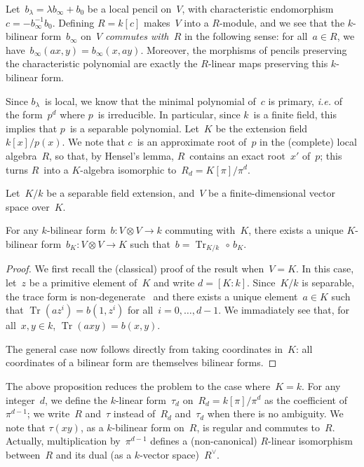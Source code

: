 \documentclass{article}%
\DeclareMathOperator\Tr{Tr}
\begin{document}
Let~$b_{λ} = λ b_{∞} + b_0$ be a local pencil on~$V$, with characteristic
endomorphism~$c = - b_{∞}^{-1} b_0$.
Defining $R = k[c]$ makes~$V$ into a $R$-module, and we see that the
$k$-bilinear form~$b_{∞}$ on~$V$ \emph{commutes with~$R$} in the
following sense: for all~$a ∈ R$, we have~$b_{∞} (a x, y) = b_{∞} (x, a
y)$.
Moreover, the morphisms of pencils preserving the characteristic
polynomial are exactly the $R$-linear maps preserving this $k$-bilinear
form.

Since $b_{λ}$~is local, we know that
the minimal polynomial of~$c$ is primary, \emph{i.e.} of the form~$p^d$
where $p$~is irreducible. In particular, since $k$~is a finite field,
this implies that $p$~is a separable polynomial.
Let~$K$ be the extension field~$k[x] / p(x)$.
We note that $c$~is an approximate root of~$p$ in the (complete) local
algebra~$R$, so that, by Hensel's lemma, $R$~contains an exact root~$x'$
of~$p$; this turns $R$~into a $K$-algebra isomorphic to~$R_d = K[π]/π^d$.

\begin{prop}\label{prop:trace-form}%
Let~$K/k$ be a separable field extension, and~$V$ be a finite-dimensional
vector space over~$K$.

For any $k$-bilinear form~$b: V ⊗ V → k$ commuting with~$K$, there
exists a unique $K$-bilinear form~$b_K: V ⊗ V → K$ such that~$b =
\Tr_{K/k} \,∘ \,b_K$.
\end{prop}

\begin{proof}
We first recall the (classical) proof of the result when~$V = K$.
In this case, let~$z$ be a primitive element of~$K$ and write $d =
[K:k]$. Since~$K/k$ is separable, the trace form is
non-degenerate~\cite[VI~5.2]{lang-algebra} and there exists a unique
element~$a ∈ K$ such that $\Tr (a z^i) = b(1, z^i)$ for all~$i=0, …,
d-1$.
We immadiately see that, for all~$x, y ∈ k$, $\Tr (a x y) = b(x, y)$.

The general case now follows directly from taking coordinates in~$K$: all
coordinates of a bilinear form are themselves bilinear forms.
\end{proof}%

The above proposition reduces the problem to the case where~$K = k$.
For any integer~$d$, we define the $k$-linear form~$τ_d$ on~$R_d =
k[π]/π^d$ as the coefficient of~$π^{d-1}$; we write~$R$ and~$τ$ instead
of~$R_d$ and~$τ_d$ when there is no ambiguity.
We note that $τ(xy)$, as a $k$-bilinear form on~$R$, is regular and
commutes to~$R$.
Actually, multiplication by~$π^{d-1}$ defines a (non-canonical)
$R$-linear isomorphism between~$R$ and its dual (as a $k$-vector
space)~$R^{∨}$.
\end{document}
